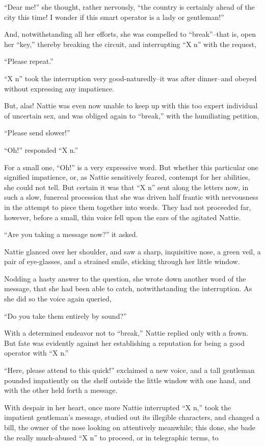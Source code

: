 ``Dear me!'' she thought, rather nervously, ``the country is certainly
ahead of the city this time! I wonder if this smart operator is a lady
or gentleman!''

And, notwithstanding all her efforts, she was compelled to ``break''--that
is, open her ``key,'' thereby breaking the circuit, and interrupting ``X n''
with the request,

``Please repeat.''

``X n'' took the interruption very good-naturedly--it was after
dinner--and obeyed without expressing any impatience.

But, alas! Nattie was even now unable to keep up with this too expert
individual of uncertain sex, and was obliged again to ``break,'' with the
humiliating petition,

``Please send slower!''

``Oh!'' responded ``X n.''

For a small one, ``Oh!'' is a very expressive word. But whether this
particular one signified impatience, or, as Nattie sensitively feared,
contempt for her abilities, she could not tell. But certain it was that
``X n'' sent along the letters now, in such a slow, funereal procession
that she was driven half frantic with nervousness in the attempt to
piece them together into words. They had not proceeded far, however,
before a small, thin voice fell upon the ears of the agitated Nattie.

``Are you taking a message now?'' it asked.

Nattie glanced over her shoulder, and saw a sharp, inquisitive nose, a
green veil, a pair of eye-glasses, and a strained smile, sticking
through her little window.

Nodding a hasty answer to the question, she wrote down another word of
the message, that she had been able to catch, notwithstanding the
interruption. As she did so the voice again queried,

``Do you take them entirely by sound?''

With a determined endeavor not to ``break,'' Nattie replied only with a
frown. But fate was evidently against her establishing a reputation for
being a good operator with ``X n.''

``Here, please attend to this quick!'' exclaimed a new voice, and a tall
gentleman pounded impatiently on the shelf outside the little window
with one hand, and with the other held forth a message.

With despair in her heart, once more Nattie interrupted ``X n,'' took the
impatient gentleman's message, studied out its illegible characters, and
changed a bill, the owner of the nose looking on attentively meanwhile;
this done, she bade the really much-abused ``X n'' to proceed, or in
telegraphic terms, to


